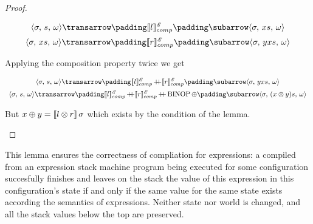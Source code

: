 \begin{proof}
\begin{itemize}
    \[
    \begin{array}{c}
      \trans{\inbr{\sigma,\,s,\,\omega}}{\sembr{l}^\mathscr{E}_{comp}}{\inbr{\sigma,\,xs,\,\omega}}\\[2mm]
      \trans{\inbr{\sigma,\,xs,\,\omega}}{\sembr{r}^\mathscr{E}_{comp}}{\inbr{\sigma,\,yxs,\,\omega}}
    \end{array}      
    \]

    Applying the composition property twice we get

    \[
    \begin{array}{c}
      \trans{\inbr{\sigma,\,s,\,\omega}}{\sembr{l}^\mathscr{E}_{comp}\dplus\sembr{r}^\mathscr{E}_{comp}}{\inbr{\sigma,\,yxs,\,\omega}}\\[2mm]
      \trans{\inbr{\sigma,\,s,\,\omega}}{\sembr{l}^\mathscr{E}_{comp}\dplus\sembr{r}^\mathscr{E}_{comp}\dplus\llang{BINOP$\,\oplus$}}{\inbr{\sigma,\,(x\otimes y)s,\,\omega}}
    \end{array}
    \]

    But $x\oplus y=\llbracket{l\otimes r}\rrbracket\,\sigma$ which exists by the condition of the lemma.    
  \end{itemize}
\end{proof}

This lemma ensures the correctness of compliation for expressions: a compiled from an expression stack machine program being executed for some configuration
succesfully finishes and leaves on the stack the value of this expression in this configuration's state if and only if the same value for the same state
exists according the semantics of expressions. Neither state nor world is changed, and all the stack values below the top are preserved.

